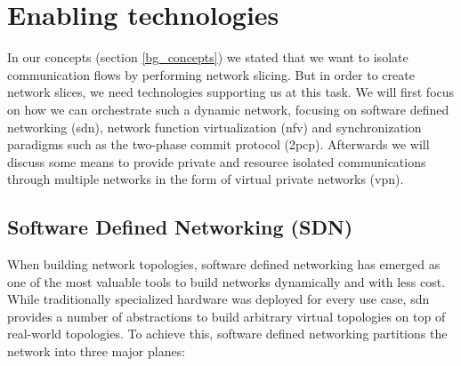\section{Enabling technologies}
In our concepts (section \ref{bg_concepts}) we stated that we want to isolate communication flows by performing network slicing. But in order to create network slices, we need technologies supporting us at this task. We will first focus on how we can orchestrate such a dynamic network, focusing on software defined networking (\acrshort{sdn}), network function virtualization (\acrshort{nfv}) and synchronization paradigms such as the two-phase commit protocol (\acrshort{2pcp}). Afterwards we will discuss some means to provide private and resource isolated communications through multiple networks in the form of virtual private networks (\acrshort{vpn}).

\subsection{Software Defined Networking (SDN)}
When building network topologies, software defined networking \cite{sdn} has emerged as one of the most valuable tools to build networks dynamically and with less cost.
While traditionally specialized hardware was deployed for every use case, \acrshort{sdn} provides a number of abstractions to build arbitrary virtual topologies on top of real-world topologies.
To achieve this, software defined networking partitions the network into three major planes:

